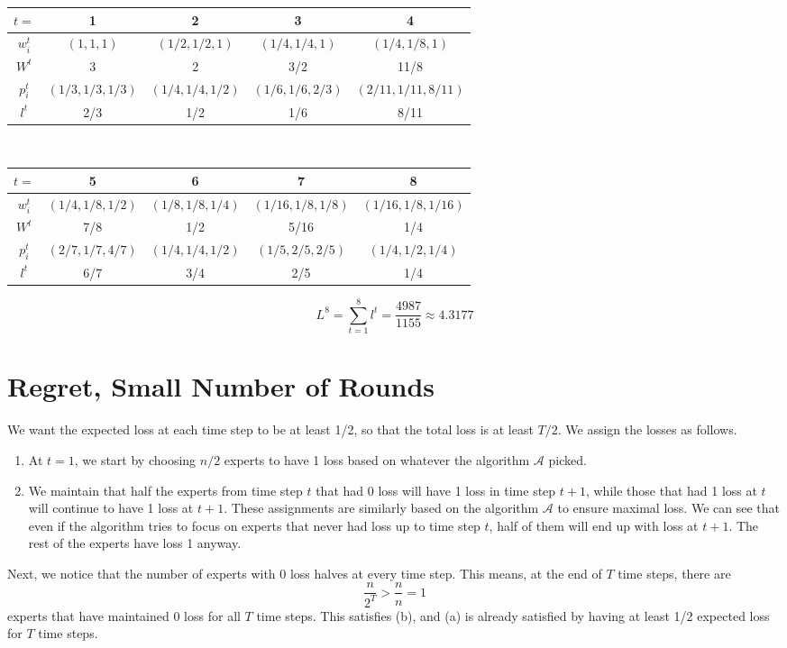 \begin{tabular}{ |c|c|c|c|c| }
    \hline
    $t=$ & 1 & 2 & 3 & 4 \\ 
    \hline
    $w_i^t$  & $(1,1,1)$ & $(1/2,1/2,1)$ & $(1/4,1/4,1)$ & $(1/4,1/8,1)$ \\
    $W^t$ & 3 & 2 & 3/2 & 11/8\\
    $p_i^t$ & $(1/3,1/3,1/3)$ & $(1/4,1/4,1/2)$ & $(1/6,1/6,2/3)$ 
    & $(2/11,1/11,8/11)$ \\  
    $l^t$ & 2/3 & 1/2 & 1/6 & 8/11 \\
    \hline
\end{tabular}\\
\begin{tabular}{ |c|c|c|c|c| }
    \hline
    $t=$ & 5 & 6 & 7 & 8 \\ 
    \hline
    $w_i^t$ & $(1/4,1/8,1/2)$ & $(1/8,1/8,1/4)$ & $(1/16,1/8,1/8)$ & $(1/16,1/8,1/16)$ \\
    $W^t$ & 7/8 & 1/2 & 5/16 & 1/4 \\
    $p_i^t$ & $(2/7,1/7,4/7)$ & $(1/4,1/4,1/2)$ 
    & $(1/5,2/5,2/5)$ & $(1/4,1/2,1/4)$ \\  
    $l^t$ & 6/7 & 3/4 & 2/5 & 1/4 \\
    \hline
\end{tabular}
\[L^8=\sum_{t=1}^{8}l^t=\frac{4987}{1155}\approx 4.3177\]

\newpage
\section{Regret, Small Number of Rounds}
We want the expected loss at each time step to be at least 1/2,
so that the total loss is at least $T/2$.
We assign the losses as follows.
\begin{enumerate}
    \item At $t=1$, we start by choosing $n/2$ experts to have 1 loss
    based on whatever the algorithm $\mathcal{A}$ picked.
    \item We maintain that half the experts from time step $t$
    that had 0 loss will have 1 loss in time step $t+1$,
    while those that had 1 loss at $t$ will continue to have 1 loss at $t+1$.
    These assignments are similarly based on the algorithm $\mathcal{A}$
    to ensure maximal loss.
    We can see that even if the algorithm tries to focus on experts that
    never had loss up to time step $t$, half of them will end up with
    loss at $t+1$.
    The rest of the experts have loss 1 anyway.
\end{enumerate}
Next, we notice that the number of experts with 0 loss halves at 
every time step.
This means, at the end of $T$ time steps, there are
\[\frac{n}{2^T}>\frac{n}{n}=1\]
experts that have maintained 0 loss for all $T$ time steps.
This satisfies (b), and (a) is already satisfied by having
at least 1/2 expected loss for $T$ time steps.

